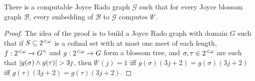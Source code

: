 \begin{theorem}
There is a computable Joyce Rado graph $\mathcal{G}$ such that for every Joyce blossom graph $\mathcal{B}$,
every embedding of $\mathcal{B}$ to $\mathcal{G}$ computes $\emptyset'$.
\end{theorem}
\begin{proof}
  
  The idea of the proof is to build a Joyce Rado graph with domain $G$ such that if $S\subseteq{2^{<\omega}}$ is a cofinal set with at most one meet of each length, $f:{2^{<\omega}}\to {G}^{\wedge}$ and $g:{2^{<\omega}}\to G$ form a blossom tree, and $\sigma,\tau\in{2^{<\omega}}$ are such that $|g(\sigma)\meet g(\tau)|>3j$, then $\emptyset'(j)=1$ iff $g(\sigma)(3j+2)=g(\sigma)(3j+2)$ iff $g(\tau)(3j+2)=g(\tau)(3j+2)$. 
  

\end{proof}
